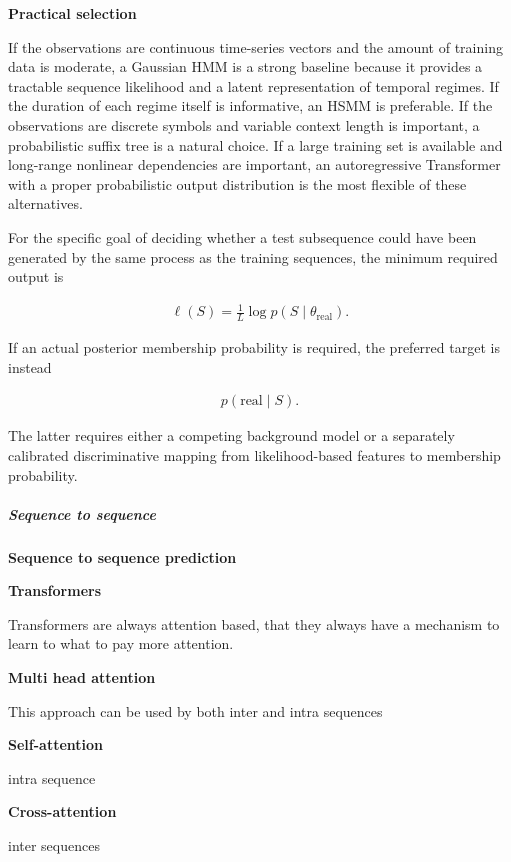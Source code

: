 \documentclass{book}
\providecommand{\ProjectDeepHeading}[2]{%
    \par\medskip\noindent\textbf{#2}\par\smallskip
}
\begin{document}
    \ProjectDeepHeading{3}{Practical selection}

        If the observations are continuous time-series vectors and the amount of training data is moderate, a Gaussian HMM is a strong baseline because it provides a tractable sequence likelihood and a latent representation of temporal regimes. If the duration of each regime itself is informative, an HSMM is preferable. If the observations are discrete symbols and variable context length is important, a probabilistic suffix tree is a natural choice. If a large training set is available and long-range nonlinear dependencies are important, an autoregressive Transformer with a proper probabilistic output distribution is the most flexible of these alternatives.

        For the specific goal of deciding whether a test subsequence could have been generated by the same process as the training sequences, the minimum required output is

        \begin{align}
            \boxed{
            \ell(S)
            =
            \frac{1}{L}\log p(S\mid\ensuremath{\theta}_{\mathrm{real}})
            }.
        \end{align}

        \noindent
        If an actual posterior membership probability is required, the preferred target is instead

        \begin{align}
            \boxed{
            p(\mathrm{real}\mid S)
            }.
        \end{align}

        \noindent
        The latter requires either a competing background model or a separately calibrated discriminative mapping from likelihood-based features to membership probability.

\subparagraph{Sequence to sequence}


\ProjectDeepHeading{3}{Sequence to sequence prediction}
    \ProjectDeepHeading{4}{Transformers}
        Transformers are always attention based, that they always have a mechanism to learn to what to pay more attention.
        
        \ProjectDeepHeading{6}{Multi head attention}
            This approach can be used by both inter and intra sequences
        \ProjectDeepHeading{4}{Self-attention}
                intra sequence
        \ProjectDeepHeading{4}{Cross-attention}
            inter sequences
\end{document}
